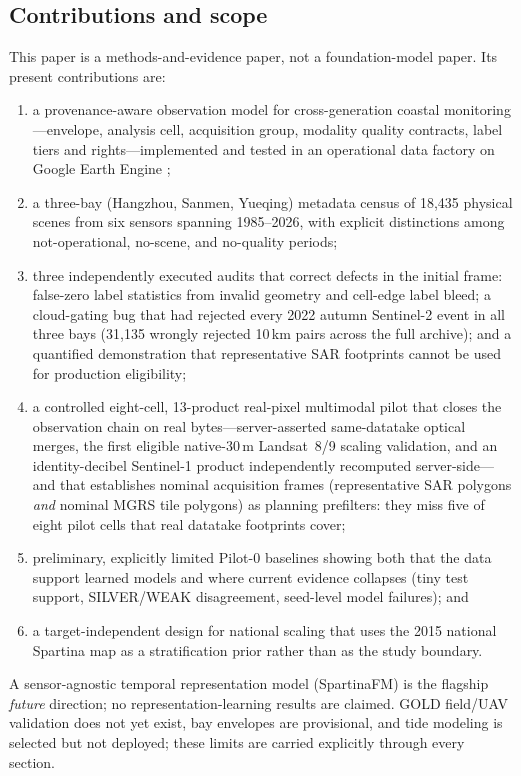 \subsection{Contributions and scope}
This paper is a methods-and-evidence paper, not a foundation-model
paper. Its present contributions are:
\begin{enumerate}[leftmargin=*]
\item a provenance-aware observation model for cross-generation
coastal monitoring---envelope, analysis cell, acquisition group,
modality quality contracts, label tiers and rights---implemented and
tested in an operational data factory on Google Earth Engine
\citep{gorelick2017gee};
\item a three-bay (Hangzhou, Sanmen, Yueqing) metadata census of
18{,}435 physical scenes from six sensors spanning 1985--2026, with
explicit distinctions among not-operational, no-scene, and no-quality
periods;
\item three independently executed audits that correct defects in the
initial frame: false-zero label statistics from invalid geometry and
cell-edge label bleed; a cloud-gating bug that had rejected every
2022 autumn Sentinel-2 event in all three bays (31{,}135 wrongly
rejected 10\,km pairs across the full archive); and a quantified
demonstration that representative SAR footprints cannot be used for
production eligibility;
\item a controlled eight-cell, 13-product real-pixel multimodal pilot
that closes the observation chain on real bytes---server-asserted
same-datatake optical merges, the first eligible native-30\,m
Landsat~8/9 scaling validation, and an identity-decibel Sentinel-1
product independently recomputed server-side---and that establishes
nominal acquisition frames (representative SAR polygons \emph{and}
nominal MGRS tile polygons) as planning prefilters: they miss five of
eight pilot cells that real datatake footprints cover;
\item preliminary, explicitly limited Pilot-0 baselines showing both
that the data support learned models and where current evidence
collapses (tiny test support, SILVER/WEAK disagreement, seed-level
model failures); and
\item a target-independent design for national scaling that uses the
2015 national Spartina map as a stratification prior rather than as the
study boundary.
\end{enumerate}
A sensor-agnostic temporal representation model (SpartinaFM) is the
flagship \emph{future} direction; no representation-learning results
are claimed. GOLD field/UAV validation does not yet exist, bay
envelopes are provisional, and tide modeling is selected but not
deployed; these limits are carried explicitly through every section.
